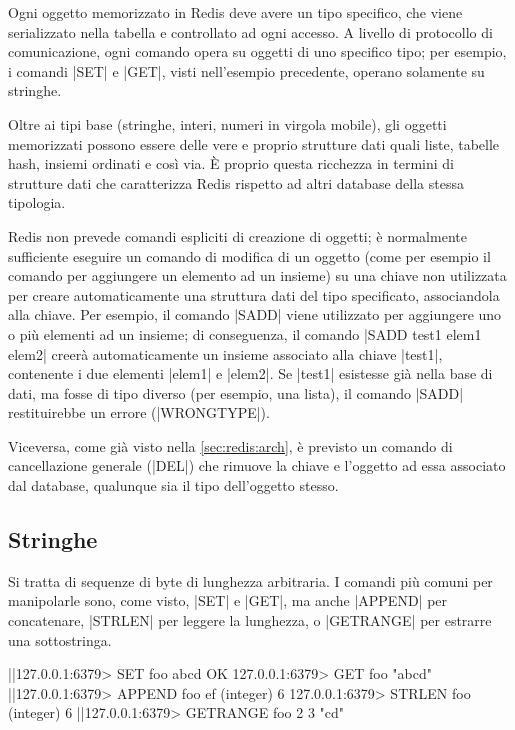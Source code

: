 Ogni oggetto memorizzato in Redis deve avere un tipo specifico, che viene serializzato
nella tabella e controllato ad ogni accesso. A livello di protocollo di comunicazione,
ogni comando opera su oggetti di uno specifico tipo; per esempio, i comandi \cverb|SET|
e \cverb|GET|, visti nell'esempio precedente, operano solamente su stringhe.

Oltre ai tipi base (stringhe, interi, numeri in virgola mobile), gli oggetti memorizzati
possono essere delle vere e proprio strutture dati quali liste, tabelle hash, insiemi
ordinati e così via. È proprio questa ricchezza in termini di strutture dati che caratterizza
Redis rispetto ad altri database della stessa tipologia.

Redis non prevede comandi espliciti di creazione di oggetti; è normalmente sufficiente
eseguire un comando di modifica di un oggetto (come per esempio il comando per aggiungere
un elemento ad un insieme) su una chiave non utilizzata per creare automaticamente una
struttura dati del tipo specificato, associandola alla chiave. Per esempio, il comando
\cverb|SADD| viene utilizzato per aggiungere uno o più elementi ad un insieme; di
conseguenza, il comando \cverb|SADD test1 elem1 elem2| creerà automaticamente un insieme 
associato alla chiave \cverb|test1|, contenente i due elementi \cverb|elem1| e \cverb|elem2|.
Se \cverb|test1| esistesse già nella base di dati, ma fosse di tipo diverso (per esempio,
una lista), il comando \cverb|SADD| restituirebbe un errore (\cverb|WRONGTYPE|).

Viceversa, come già visto nella \autoref{sec:redis:arch}, è previsto un comando di cancellazione
generale (\cverb|DEL|) che rimuove la chiave e l'oggetto ad essa associato dal database,
qualunque sia il tipo dell'oggetto stesso.


\subsection{Stringhe}

Si tratta di sequenze di byte di lunghezza arbitraria. I comandi
più comuni per manipolarle sono, come visto, \cverb|SET| e \cverb|GET|, ma anche \cverb|APPEND|
per concatenare, \cverb|STRLEN| per leggere la lunghezza, o \cverb|GETRANGE| per estrarre una
sottostringa.

\begin{commentedsource}[style=redis]
|\lnote|127.0.0.1:6379> SET foo abcd
OK
127.0.0.1:6379> GET foo
"abcd"
|\lnote|127.0.0.1:6379> APPEND foo ef
(integer) 6
127.0.0.1:6379> STRLEN foo
(integer) 6
|\lnote|127.0.0.1:6379> GETRANGE foo 2 3
"cd"
\end{commentedsource}

